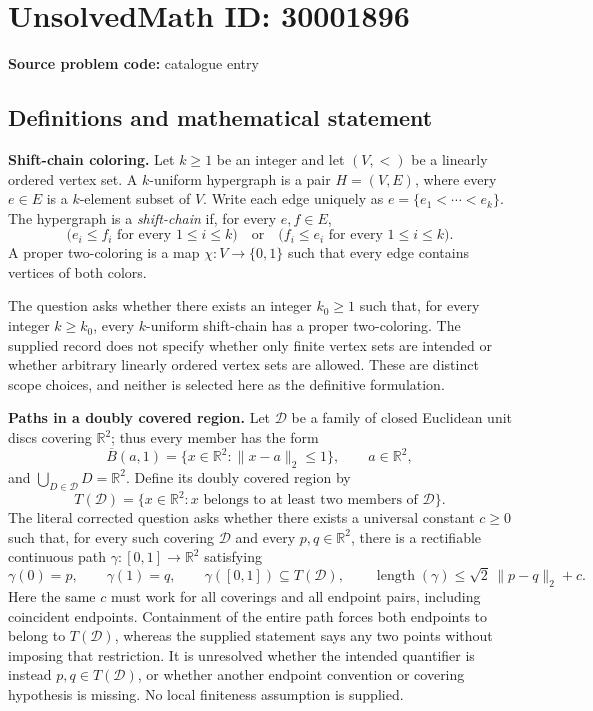 \documentclass[11pt]{article}
\newcommand{\R}{\mathbb{R}}
\begin{document}
\section*{UnsolvedMath ID: 30001896}
\textbf{Source problem code:} catalogue entry
\subsection{Definitions and mathematical statement}
\textbf{Shift-chain coloring.}
Let \(k\geq 1\) be an integer and let \((V,<)\) be a linearly ordered vertex set. A \(k\)-uniform hypergraph is a pair \(H=(V,E)\), where every \(e\in E\) is a \(k\)-element subset of \(V\). Write each edge uniquely as \(e=\{e_1<\cdots<e_k\}\). The hypergraph is a \emph{shift-chain} if, for every \(e,f\in E\),
\[
\bigl(e_i\leq f_i\text{ for every }1\leq i\leq k\bigr)
\quad\text{or}\quad
\bigl(f_i\leq e_i\text{ for every }1\leq i\leq k\bigr).
\]
A proper two-coloring is a map \(\chi:V\to\{0,1\}\) such that every edge contains vertices of both colors.

The question asks whether there exists an integer \(k_0\geq 1\) such that, for every integer \(k\geq k_0\), every \(k\)-uniform shift-chain has a proper two-coloring. The supplied record does not specify whether only finite vertex sets are intended or whether arbitrary linearly ordered vertex sets are allowed. These are distinct scope choices, and neither is selected here as the definitive formulation.

\textbf{Paths in a doubly covered region.}
Let \(\mathcal D\) be a family of closed Euclidean unit discs covering \(\R^2\); thus every member has the form
\[
\overline B(a,1)=\{x\in\R^2:\|x-a\|_2\leq 1\},
\qquad a\in\R^2,
\]
and \(\bigcup_{D\in\mathcal D}D=\R^2\). Define its doubly covered region by
\[
T(\mathcal D)=\{x\in\R^2:x\text{ belongs to at least two members of }\mathcal D\}.
\]
The literal corrected question asks whether there exists a universal constant \(c\geq 0\) such that, for every such covering \(\mathcal D\) and every \(p,q\in\R^2\), there is a rectifiable continuous path \(\gamma:[0,1]\to\R^2\) satisfying
\[
\gamma(0)=p,\qquad \gamma(1)=q,\qquad
\gamma([0,1])\subseteq T(\mathcal D),\qquad
\operatorname{length}(\gamma)\leq\sqrt{2}\,\|p-q\|_2+c.
\]
Here the same \(c\) must work for all coverings and all endpoint pairs, including coincident endpoints. Containment of the entire path forces both endpoints to belong to \(T(\mathcal D)\), whereas the supplied statement says any two points without imposing that restriction. It is unresolved whether the intended quantifier is instead \(p,q\in T(\mathcal D)\), or whether another endpoint convention or covering hypothesis is missing. No local finiteness assumption is supplied.
\end{document}
